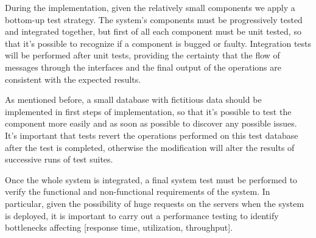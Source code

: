 During the implementation, given the relatively small components we apply a bottom-up test strategy. The system's components must be progressively tested and integrated together, but first of all each component must be unit tested, so that it's possible to recognize if a component is bugged or faulty. Integration tests will be performed after unit tests, providing the certainty that the flow of messages through the interfaces and the final output of the operations are consistent with the expected results.

As mentioned before, a small database with fictitious data should be implemented in first steps of implementation, so that it's possible to test the component more easily and as soon as possible to discover any possible issues. It's important that tests revert the operations performed on this test database after the test is completed, otherwise the modification will alter the results of successive runs of test suites.

Once the whole system is integrated, a final system test must be performed to verify the functional and non-functional requirements of the system. In particular, given the possibility of huge requests on the servers when the system is deployed, it is important to carry out a performance testing to identify bottlenecks affecting [response time, utilization, throughput].